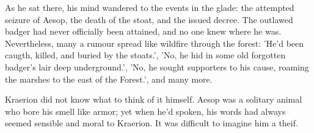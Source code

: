 As he sat there, his mind wandered to the events in the glade: the attempted seizure of Aesop, the death of the stoat, and the issued decree. The outlawed badger had never officially been attained, and no one knew where he was. Nevertheless, many a rumour spread like wildfire through the forest: 'He'd been caugth, killed, and buried by the stoats.', 'No, he hid in some old forgotten badger's lair deep underground.', 'No, he sought supporters to his cause, roaming the marshes to the east of the Forest.', and many more.

Kraerion did not know what to think of it himself. Aesop was a solitary animal who bore his smell like armor; yet when he'd spoken, his words had always seemed sensible and moral to Kraerion. It was difficult to imagine him a theif.





